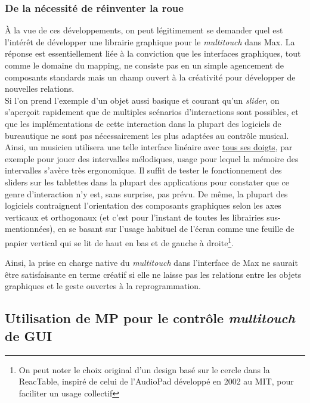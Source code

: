 \subsubsection{De la nécessité de réinventer la roue} 

\noindent À la vue de ces développements, on peut légitimement se demander quel est l'intérêt de développer une librairie graphique pour le \textit{multitouch} dans Max. La réponse est essentiellement liée à la conviction que les interfaces graphiques, tout comme le domaine du mapping, ne consiste pas en un simple agencement de composants standards mais un champ ouvert à la créativité pour développer de nouvelles relations. \\
\indent Si l'on prend l'exemple d'un objet aussi basique et courant qu'un \textit{slider}, on s'aperçoit rapidement que de multiples scénarios d'interactions sont possibles, et que les implémentations de cette interaction dans la plupart des logiciels de bureautique ne sont pas nécessairement les plus adaptées au contrôle musical. Ainsi, un musicien utilisera une telle interface linéaire avec \underline{tous ses doigts}, par exemple pour jouer des intervalles mélodiques, usage pour lequel la mémoire des intervalles s'avère très ergonomique. Il suffit de tester le fonctionnement des sliders sur les tablettes dans la plupart des applications pour constater que ce genre d'interaction n'y est, sans surprise, pas prévu. De même, la plupart des logiciels contraignent l'orientation des composants graphiques selon les axes verticaux et orthogonaux (et c'est pour l'instant de toutes les librairies sus-mentionnées), en se basant sur l'usage habituel de l'écran comme une feuille de papier vertical qui se lit de haut en bas et de gauche à droite\footnote{On peut noter le choix original d'un design basé sur le cercle dans la ReacTable, inspiré de celui de l'AudioPad développé en 2002 au \gls{MIT}, pour faciliter un usage collectif}.

Ainsi, la prise en charge native du \textit{multitouch} dans l'interface de Max ne saurait être satisfaisante en terme créatif si elle ne laisse pas les relations entre les objets graphiques et le geste ouvertes à la reprogrammation. 

\subsection{Utilisation de MP pour le contrôle \textit{multitouch} de GUI}

